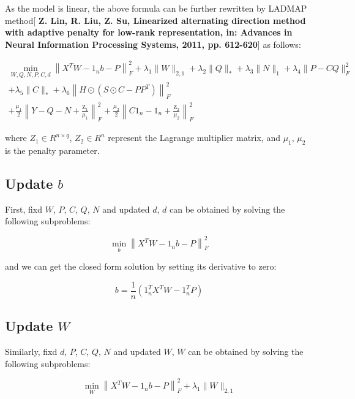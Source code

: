 \documentclass[final,3p,times]{elsarticle}
\begin{document}
As the model is linear, the above formula can be further rewritten by LADMAP method[\textbf{ Z. Lin, R. Liu, Z. Su, Linearized alternating direction method with adaptive penalty for low-rank representation, in: Advances in Neural Information Processing Systems, 2011, pp. 612-620}] as follows:

\begin{equation}
	\begin{array}{l}
		\min _{W, Q, N, P, C, d}\left\|X^{T} W-1_{n} b-P\right\|_{F}^{2}+\lambda_{1}\|W\|_{2,1}+\lambda_{2}\|Q\|_{*}+\lambda_{3}\|N\|_{1}+\lambda_{4}\|P-C Q\|_{F}^{2} \\
		+\lambda_{5}\|C\|_{*}+\lambda_{6}\left\|H \odot\left(S \odot C-P P^{T}\right)\right\|_{F}^{2}\\
		+\frac{\mu_{1}}{2}\left\|Y-Q-N+\frac{\mathrm{Z}_1}{\mu_1}\right\|_{F}^{2}+\frac{\mu_{2}}{2}\left\|C 1_{n}-1_{n}+\frac{\mathrm{Z}_{2}}{\mu_{2}}\right\|_{F}^{2}
	\end{array}
\end{equation}

\noindent where $Z_{1} \in R^{n \times q}$, $Z_{2} \in R^{n}$ represent the Lagrange multiplier matrix, and $\mu_{1}$, $\mu_{2}$ is the penalty parameter.

\subsection{Update $b$}

First, fixd $W$, $P$, $C$, $Q$, $N$ and updated $d$, $d$ can be obtained by solving the following subproblems:

\begin{equation}
	\min _{b}\left\|X^{T} W-1_{n} b-P\right\|_{F}^{2}
\end{equation}

and we can get the closed form solution by setting its derivative to zero:

\begin{equation}
	b=\frac{1}{n}\left(1_{n}^{T} X^{T} W-1_{n}^{T} P\right)
\end{equation}

\subsection{Update $W$}

Similarly, fixd $d$, $P$, $C$, $Q$, $N$ and updated $W$, $W$ can be obtained by solving the following subproblems:

\begin{equation}
	\min _{W}\left\|X^{T} W-1_{n} b-P\right\|_{F}^{2}+\lambda_{1}\|W\|_{2,1}
\end{equation}
\end{document}
